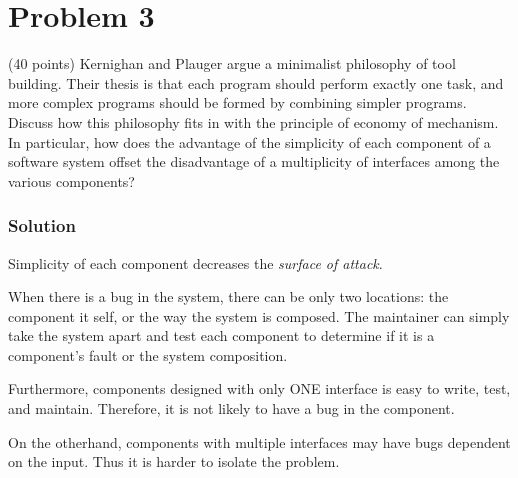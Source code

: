 \section*{Problem 3}

(40 points) Kernighan and Plauger argue a minimalist philosophy of tool building. 
Their thesis is that each program should perform exactly one task, and more complex programs should be formed by combining simpler programs. 
Discuss how this philosophy fits in with the principle of economy of mechanism. 
In particular, how does the advantage of the simplicity of each component of a software system offset the disadvantage of a multiplicity of interfaces among the various components?

\subsubsection*{Solution}

Simplicity of each component decreases the \textit{surface of attack}.

When there is a bug in the system, there can be only two locations: the component it self, or the way the system is composed.
The maintainer can simply take the system apart and test each component to determine if it is a component's fault or the system composition.

Furthermore, components designed with only ONE interface is easy to write, test, and maintain. 
Therefore, it is not likely to have a bug in the component. 

On the otherhand, components with multiple interfaces may have bugs dependent on the input.
Thus it is harder to isolate the problem.
